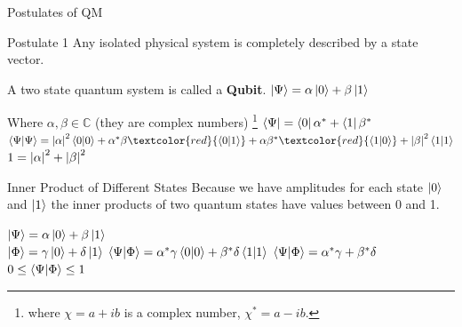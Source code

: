\documentclass{beamer}
\begin{document}
\begin{frame}{Postulates of QM}
\begin{block}{Postulate 1}
Any isolated physical system is completely described by a state vector.
\end{block}
\vfill
A two state quantum system is called a \textbf{Qubit}.
\vfill
\centering
\begin{math}
    \ket{\Psi} = \alpha\ket{0} + \beta\ket{1}
\end{math}\vfill

Where $\alpha, \beta \in \mathbb{C}$ (they are complex numbers)
\footnote{where $\chi=a+ib$ is a complex number, $\chi^*=a-ib$.}
\vfill
\pause
\begin{math}
    \bra{\Psi} = \bra{0}\alpha^* + \bra{1}\beta^*
\end{math}
\vfill
\pause
\begin{math}
    \braket{\Psi}{\Psi} = \abs{\alpha}^2\braket{0}{0} + \alpha^*\beta\textcolor{red}{\braket{0}{1}} + \alpha\beta^*\textcolor{red}{\braket{1}{0}} + \abs{\beta}^2\braket{1}{1}
\end{math}\vfill\pause
\begin{math}
    1 = \abs{\alpha}^2 + \abs{\beta}^2
\end{math}\vfill
\end{frame}

\begin{frame}{Inner Product of Different States}
    Because we have amplitudes for each state $\ket{0}$ and $\ket{1}$ the inner products of two quantum states have values between 0 and 1.
    \begin{center}
        \begin{math}
            \ket{\Psi} = \alpha\ket{0} + \beta\ket{1}
        \end{math}\\
        \begin{math}
            \ket{\Phi} = \gamma\ket{0} + \delta\ket{1}
        \end{math}
        \vfill
        \begin{math}
            \braket{\Psi}{\Phi} = \alpha^*\gamma\braket{0}{0} + \beta^*\delta\braket{1}{1}
        \end{math}\vfill
        \begin{math}
            \braket{\Psi}{\Phi} = \alpha^*\gamma + \beta^*\delta
        \end{math}\vfill
        \begin{math}
            0 \le \braket{\Psi}{\Phi} \le 1
        \end{math}\vfill
    
    \end{center}
    
\end{frame}
\end{document}

